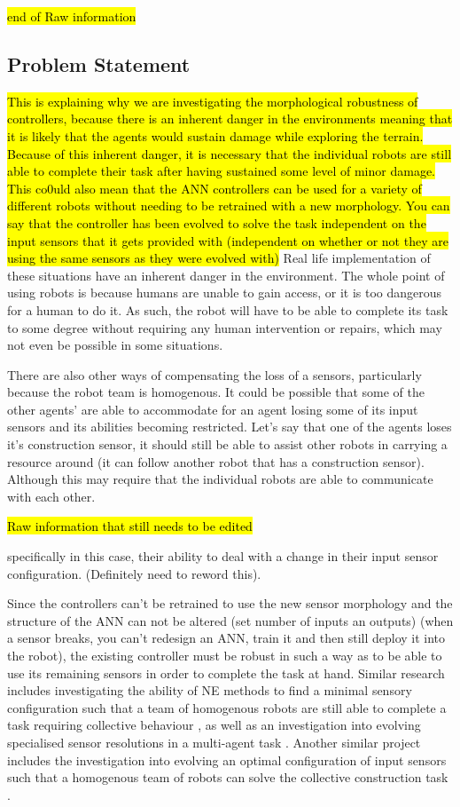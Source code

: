\documentclass[conference]{IEEEtran}
\DeclareRobustCommand{\hlcyan}[1]{{\sethlcolor{cyan}\hl{#1}}}
\begin{document}
\hl{end of Raw information}

\subsection{Problem Statement}

\hlcyan{This is explaining why we are investigating the morphological robustness of controllers, because there is an inherent danger in the environments meaning that it is likely that the agents would sustain damage while exploring the terrain. Because of this inherent danger, it is necessary that the individual robots are still able to complete their task after having sustained some level of minor damage. This co0uld also mean that the ANN controllers can be used for a variety of different robots without needing to be retrained with a new morphology. You can say that the controller has been evolved to solve the task independent on the input sensors that it gets provided with (independent on whether or not they are using the same sensors as they were evolved with)}
Real life implementation of these situations have an inherent danger in the environment. The whole point of using robots is because humans are unable to gain access, or it is too dangerous for a human to do it. As such, the robot will have to be able to complete its task to some degree without requiring any human intervention or repairs, which may not even be possible in some situations.

There are also other ways of compensating the loss of a sensors, particularly because the robot team is homogenous. It could be possible that some of the other agents' are able to accommodate for an agent losing some of its input sensors and its abilities becoming restricted. Let's say that one of the agents loses it's construction sensor, it should still be able to assist other robots in carrying a resource around (it can follow another robot that has a construction sensor). Although this may require that the individual robots are able to communicate with each other.

\hl{Raw information that still needs to be edited}

specifically in this case, their ability to deal with a change in their input sensor configuration. (Definitely need to reword this).

Since the controllers can't be retrained to use the new sensor morphology and the structure of the ANN can not be altered (set number of inputs an outputs) (when a sensor breaks, you can't redesign an ANN, train it and then still deploy it into the robot), the existing controller must be robust in such a way as to be able to use its remaining sensors in order to complete the task at hand.
Similar research includes investigating the ability of NE methods to find a minimal sensory configuration such that a team of homogenous robots are still able to complete a task requiring collective behaviour \cite{WatsonNitschke2015CEC}, as well as an investigation into evolving specialised sensor resolutions in a multi-agent task \cite{RefWorks:25}.
Another similar project includes the investigation into evolving an optimal configuration of input sensors such that a  homogenous team of robots can solve the collective construction task \cite{WatsonNitschke2015SSCI}.
\end{document}
